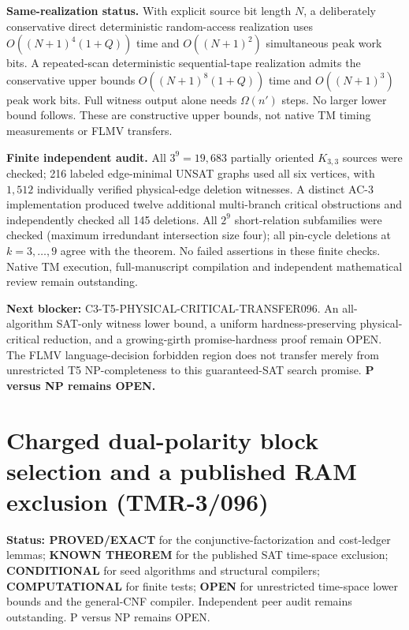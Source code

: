 \documentclass[11pt]{article}
\begin{document}
\textbf{Same-realization status.}
With explicit source bit length $N$, a deliberately conservative
direct deterministic random-access realization uses
$O((N+1)^4(1+Q))$ time and $O((N+1)^2)$ simultaneous peak work bits.
A repeated-scan deterministic sequential-tape realization admits the
conservative upper bounds $O((N+1)^8(1+Q))$ time and $O((N+1)^3)$
peak work bits. Full witness output alone needs $\Omega(n')$ steps.
No larger lower bound follows. These are constructive upper bounds,
not native TM timing measurements or FLMV transfers.

\textbf{Finite independent audit.}
All $3^9=19{,}683$ partially oriented $K_{3,3}$ sources were checked;
216 labeled edge-minimal UNSAT graphs used all six vertices, with
$1{,}512$ individually verified physical-edge deletion witnesses.
A distinct AC-3 implementation produced twelve additional
multi-branch critical obstructions and independently checked all
145 deletions. All $2^9$ short-relation subfamilies were checked
(maximum irredundant intersection size four); all pin-cycle deletions
at $k=3,\dots,9$ agree with the theorem. No failed assertions in
these finite checks. Native TM execution, full-manuscript compilation
and independent mathematical review remain outstanding.

\textbf{Next blocker:} C3-T5-PHYSICAL-CRITICAL-TRANSFER096.
An all-algorithm SAT-only witness lower bound, a uniform
hardness-preserving physical-critical reduction, and a growing-girth
promise-hardness proof remain OPEN. The FLMV language-decision
forbidden region does not transfer merely from unrestricted T5
NP-completeness to this guaranteed-SAT search promise.
\textbf{P versus NP remains OPEN.}


\section{Charged dual-polarity block selection and a published RAM exclusion (TMR-3/096)}

\noindent\textbf{Status: PROVED/EXACT} for the conjunctive-factorization and cost-ledger
lemmas; \textbf{KNOWN THEOREM} for the published SAT time-space exclusion;
\textbf{CONDITIONAL} for seed algorithms and structural compilers;
\textbf{COMPUTATIONAL} for finite tests; \textbf{OPEN} for unrestricted
time-space lower bounds and the general-CNF compiler.  Independent peer audit
remains outstanding. P versus NP remains OPEN.
\end{document}
